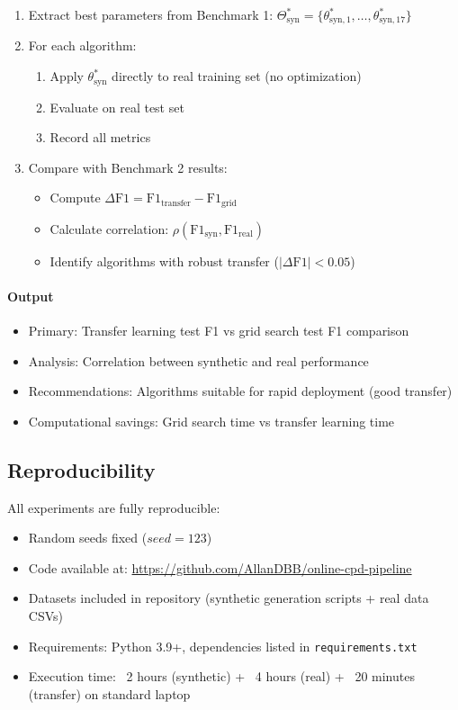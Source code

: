 \begin{enumerate}
    \item Extract best parameters from Benchmark 1: $\Theta^*_{\text{syn}} = \{\theta^*_{\text{syn},1}, \ldots, \theta^*_{\text{syn},17}\}$
    \item For each algorithm:
    \begin{enumerate}
        \item Apply $\theta^*_{\text{syn}}$ directly to real training set (no optimization)
        \item Evaluate on real test set
        \item Record all metrics
    \end{enumerate}
    \item Compare with Benchmark 2 results:
    \begin{itemize}
        \item Compute $\Delta \text{F1} = \text{F1}_{\text{transfer}} - \text{F1}_{\text{grid}}$
        \item Calculate correlation: $\rho(\text{F1}_{\text{syn}}, \text{F1}_{\text{real}})$
        \item Identify algorithms with robust transfer ($|\Delta \text{F1}| < 0.05$)
    \end{itemize}
\end{enumerate}

\paragraph{Output}

\begin{itemize}
    \item Primary: Transfer learning test F1 vs grid search test F1 comparison
    \item Analysis: Correlation between synthetic and real performance
    \item Recommendations: Algorithms suitable for rapid deployment (good transfer)
    \item Computational savings: Grid search time vs transfer learning time
\end{itemize}

\subsection{Reproducibility}
\label{sec:reproducibility}

All experiments are fully reproducible:
\begin{itemize}
    \item Random seeds fixed ($seed=123$)
    \item Code available at: \url{https://github.com/AllanDBB/online-cpd-pipeline}
    \item Datasets included in repository (synthetic generation scripts + real data CSVs)
    \item Requirements: Python 3.9+, dependencies listed in \texttt{requirements.txt}
    \item Execution time: ~2 hours (synthetic) + ~4 hours (real) + ~20 minutes (transfer) on standard laptop
\end{itemize}

